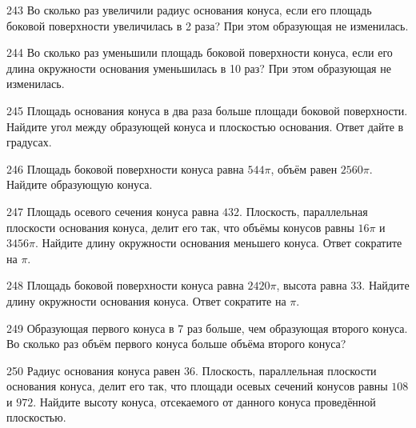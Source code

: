 \documentclass[a4paper]{article}
\begin{document}
\begin{taskBN}{243}
Во сколько раз увеличили радиус основания конуса, если его площадь боковой поверхности увеличилась в 2 раза? При этом образующая не изменилась.
\end{taskBN}

\begin{taskBN}{244}
Во сколько раз уменьшили площадь боковой поверхности конуса, если его длина окружности основания уменьшилась в 10 раз? При этом образующая не изменилась.
\end{taskBN}

\begin{taskBN}{245}
Площадь основания конуса в два раза больше площади боковой поверхности. Найдите угол между образующей конуса и плоскостью основания. Ответ дайте в градусах.
\end{taskBN}

\begin{taskBN}{246}
Площадь боковой поверхности конуса равна $544\pi$, объём равен $2560\pi$. Найдите образующую конуса. 
\end{taskBN}

\begin{taskBN}{247}
Площадь осевого сечения конуса равна $432$. Плоскость, параллельная плоскости основания конуса,  делит его так, что объёмы конусов равны $16\pi$ и $3456\pi$. Найдите длину окружности основания меньшего конуса. Ответ сократите на $\pi$.
\end{taskBN}

\begin{taskBN}{248}
Площадь боковой поверхности конуса равна $2420\pi$, высота равна $33$. Найдите длину окружности основания конуса. Ответ сократите на $\pi$.
\end{taskBN}

\begin{taskBN}{249}
Образующая первого конуса в 7 раз больше, чем образующая второго конуса. Во сколько раз объём первого конуса больше объёма второго конуса?
\end{taskBN}

\begin{taskBN}{250}
Радиус основания конуса равен $36$. Плоскость, параллельная плоскости основания конуса,  делит его так, что площади осевых сечений конусов равны $108$ и $972$. Найдите высоту конуса, отсекаемого от данного конуса проведённой плоскостью. 
\end{taskBN}
\end{document}
